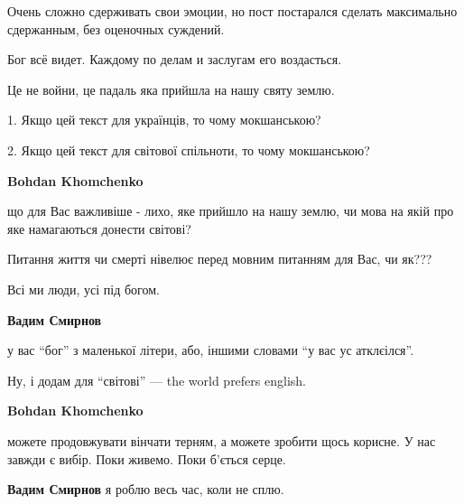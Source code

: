  
 
 
 
 
\zzSecCmt

\begin{itemize} %

Очень сложно сдерживать свои эмоции, но пост постарался сделать максимально
сдержанным, без оценочных суждений.

Бог всё видет. Каждому по делам и заслугам его воздасться.

Це не войни, це падаль яка прийшла на нашу святу землю.


1. Якщо цей текст для українців, то чому мокшанською?

2. Якщо цей текст для світової спільноти, то чому мокшанською?

\begin{itemize} %
\textbf{Bohdan Khomchenko} 

що для Вас важливіше - лихо, яке прийшло на нашу землю, чи мова на якій про яке
намагаються донести світові?

Питання життя чи смерті нівелює перед мовним питанням для Вас, чи як???

Всі ми люди, усі під богом.

\textbf{Вадим Смирнов} 

у вас \enquote{бог} з маленької літери, або, іншими словами \enquote{у вас ус атклєілся}.

Ну, і додам для \enquote{світові} — the world prefers english.

\textbf{Bohdan Khomchenko} 

можете продовжувати вінчати терням, а можете зробити щось корисне. У нас завжди
є вибір. Поки живемо. Поки б'ється серце.

\textbf{Вадим Смирнов} я роблю весь час, коли не сплю.
\end{itemize} %

\end{itemize} %
